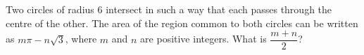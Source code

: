 Two circles of radius $6$ intersect in such a way that each passes through the centre of the other. The area of the region common to both circles can be written as $m\pi-n\sqrt3$, where $m$ and $n$ are positive integers. What is $\dfrac{m+n}{2}$?
